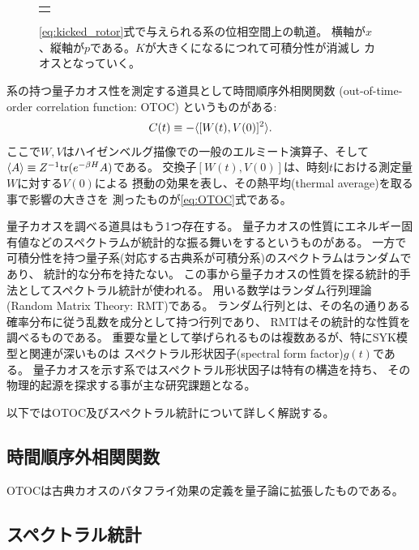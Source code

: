 \begin{figure}[ht]
\begin{tabular}{c}
\begin{minipage}{0.33\hsize}
		\end{minipage}
	\end{tabular}
	\caption{\eqref{eq:kicked_rotor}式で与えられる系の位相空間上の軌道。
		横軸が$x$、縦軸が$p$である。$K$が大きくになるにつれて可積分性が消滅し
		カオスとなっていく。}
	\label{fig:phase_space_of_kicked_rotor}
\end{figure}

系の持つ量子カオス性を測定する道具として時間順序外相関関数
(out-of-time-order correlation function: OTOC)
というものがある:
\begin{align}
	C(t) \equiv -\langle [W(t), V(0)]^2 \rangle.
	\label{eq:OTOC}
\end{align}
ここで$W, V$はハイゼンベルグ描像での一般のエルミート演算子、そして
$\langle A \rangle \equiv Z^{-1}\mathrm{tr}(e^{-\beta H}A)$である。
交換子$[W(t), V(0)]$は、時刻$t$における測定量$W$に対する$V(0)$による
摂動の効果を表し、その熱平均(thermal average)を取る事で影響の大きさを
測ったものが\eqref{eq:OTOC}式である。

量子カオスを調べる道具はもう1つ存在する。
量子カオスの性質にエネルギー固有値などのスペクトラムが統計的な振る舞いをするというものがある。
一方で可積分性を持つ量子系(対応する古典系が可積分系)のスペクトラムはランダムであり、
統計的な分布を持たない。
この事から量子カオスの性質を探る統計的手法としてスペクトラル統計が使われる。
用いる数学はランダム行列理論(Random Matrix Theory: RMT)である。
ランダム行列とは、その名の通りある確率分布に従う乱数を成分として持つ行列であり、
RMTはその統計的な性質を調べるものである。
重要な量として挙げられるものは複数あるが、特にSYK模型と関連が深いものは
スペクトラル形状因子(spectral form factor)$g(t)$である。
量子カオスを示す系ではスペクトラル形状因子は特有の構造を持ち、
その物理的起源を探求する事が主な研究課題となる。

以下ではOTOC及びスペクトラル統計について詳しく解説する。

\subsection{時間順序外相関関数}
OTOCは古典カオスのバタフライ効果の定義を量子論に拡張したものである。


\subsection{スペクトラル統計}

\pagebreak
